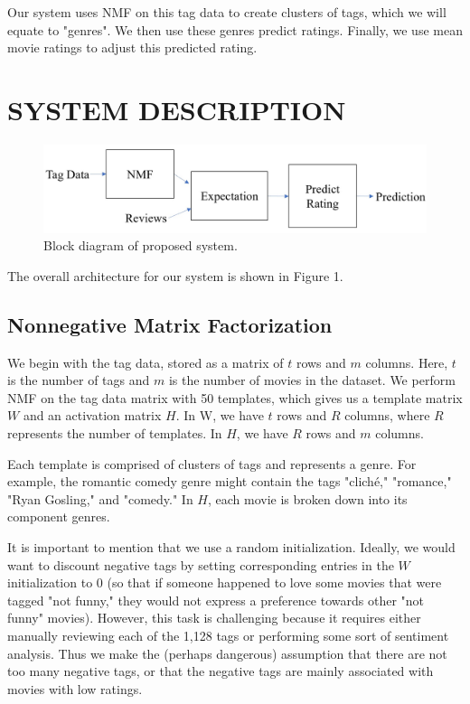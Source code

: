 \documentclass[letterpaper, 10 pt, conference]{ieeeconf}  %
\begin{document}
Our system uses NMF on this tag data to create clusters of tags, which we will equate to "genres". We then use these genres predict ratings. Finally, we use mean movie ratings to adjust this predicted rating.


\section{SYSTEM DESCRIPTION}

\begin{figure}[h]
   \includegraphics[scale=0.5]{./figs/blockdiagram.jpg}
   \caption{Block diagram of proposed system.}
\end{figure}

The overall architecture for our system is shown in Figure 1.

\subsection{Nonnegative Matrix Factorization}

We begin with the tag data, stored as a matrix of $t$ rows and $m$ columns. Here, $t$ is the number of tags and $m$ is the number of movies in the dataset.
We perform NMF on the tag data matrix with 50 templates, which gives us a template matrix $W$ and an activation matrix $H$.
In W, we have $t$ rows and $R$ columns, where $R$ represents the number of templates. In $H$, we have $R$ rows and $m$ columns. 

Each template is comprised of clusters of tags and represents a genre. For example, the romantic comedy genre might contain the tags "cliché," "romance," "Ryan Gosling," and "comedy." In $H$, each movie is broken down into its component genres.

It is important to mention that we use a random initialization. Ideally, we would want to discount negative tags by setting corresponding entries in the $W$ initialization to 0 (so that if someone happened to love some movies that were tagged "not funny," they would not express a preference towards other "not funny" movies). However, this task is challenging because it requires either manually reviewing each of the 1,128 tags or performing some sort of sentiment analysis. Thus we make the (perhaps dangerous) assumption that there are not too many negative tags, or that the negative tags are mainly associated with movies with low ratings.
\end{document}
